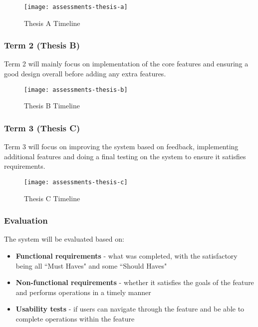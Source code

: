 \begin{figure}[h!]
	\centering
	\texttt{[image: assessments-thesis-a]}
	\caption{Thesis A Timeline}
\end{figure}

\subsubsection{Term 2 (Thesis B)}
Term 2 will mainly focus on implementation of the core features and ensuring a good design overall before adding any extra features.\\

\begin{figure}[h!]
	\centering
	\texttt{[image: assessments-thesis-b]}
	\caption{Thesis B Timeline}
\end{figure}

\subsubsection{Term 3 (Thesis C)}
Term 3 will focus on improving the system based on feedback, implementing additional features and doing a final testing on the system to ensure it satisfies requirements.\\

\begin{figure}[h!]
	\centering
	\texttt{[image: assessments-thesis-c]}
	\caption{Thesis C Timeline}
\end{figure}


\subsubsection{Evaluation}
The system will be evaluated based on:
\begin{itemize}
	\item \textbf{Functional requirements} - what was completed, with the satisfactory being all ``Must Haves" and some ``Should Haves"
	\item \textbf{Non-functional requirements} - whether it satisfies the goals of the feature and performs operations in a timely manner
	\item \textbf{Usability tests} - if users can navigate through the feature and be able to complete operations within the feature
\end{itemize}


\newpage